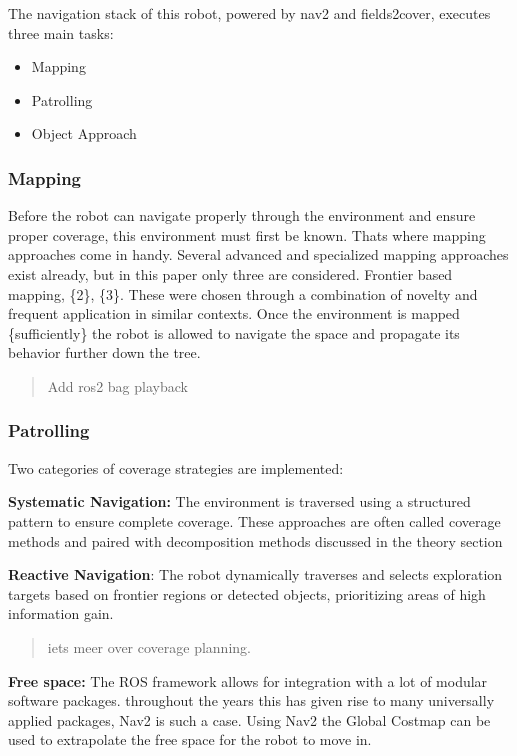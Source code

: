 The navigation stack of this robot, powered by nav2 and fields2cover, executes three main tasks:

\begin{itemize}
\item Mapping
\item Patrolling
\item Object Approach
\end{itemize}

\subsubsection{Mapping}

Before the robot can navigate properly through the environment and ensure proper coverage, this environment must first be known. Thats where mapping approaches come in handy. Several advanced and specialized mapping approaches exist already, but in this paper only three are considered. Frontier based mapping, \{2\}, \{3\}. These were chosen through a combination of novelty and frequent application in similar contexts. Once the environment is mapped \{sufficiently\} the robot is allowed to navigate the space and propagate its behavior further down the tree.

\begin{quote}
Add ros2 bag playback
\end{quote}

\subsubsection{Patrolling}

Two categories of coverage strategies are implemented:

\textbf{Systematic Navigation:} The environment is traversed using a structured pattern to ensure complete coverage. These approaches are often called coverage methods and paired with decomposition methods discussed in the theory section

\textbf{Reactive Navigation}: The robot dynamically traverses and selects exploration targets based on frontier regions or detected objects, prioritizing areas of high information gain.

\begin{quote}
iets meer over coverage planning.
\end{quote}

\textbf{Free space:}
The ROS framework allows for integration with a lot of modular software packages. throughout the years this has given rise to many universally applied packages, Nav2 is such a case.
Using Nav2 the Global Costmap can be used to extrapolate the free space for the robot to move in.

